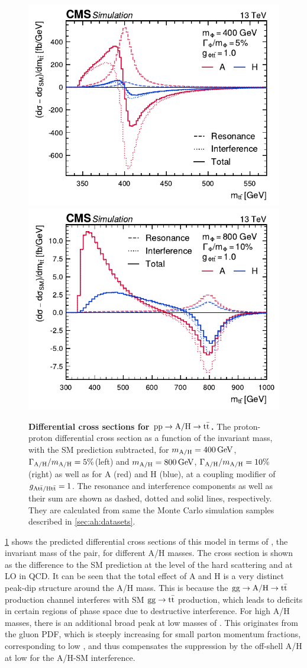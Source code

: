 \begin{figure}[ht!]
    \centering
    \includegraphics[width=0.49\linewidth]{figures/ah/ah_xs/ahspectrum_400.pdf}
    \hfill
    \includegraphics[width=0.49\linewidth]{figures/ah/ah_xs/ahspectrum_800.pdf}
    \caption{\textbf{Differential cross sections for $\mathrm{pp} \rightarrow \mathrm{A/H} \rightarrow \mathrm{t \bar{t}}$.} The proton-proton differential cross section as a function of the invariant \ttbar mass, with the SM prediction subtracted, for $m_{\mathrm{A/H}} = \SI{400}{GeV}$, $\Gamma_{\mathrm{A/H}}/m_{\mathrm{A/H}} = 5\%$(left) and $\mAH= \SI{800}{\GeV}$, $\Gamma_{\mathrm{A/H}}/m_{\mathrm{A/H}} = 10\%$ (right) as well as for A (red) and H (blue), at a coupling modifier of $g_{\mathrm{A t \bar{t} / H t \bar{t}}} = 1$. The resonance and interference components as well as their sum are shown as dashed, dotted and solid lines, respectively. They are calculated from same the Monte Carlo simulation samples described in \cref{sec:ah:datasets}.}
    \label{fig:theory:ahxs}
\end{figure}

\cref{fig:theory:ahxs} shows the predicted differential cross sections of this model in terms of \mtt, the invariant mass of the \ttbar pair, for different A/H masses. The cross section is shown as the difference to the SM prediction at the level of the hard scattering and at LO in QCD. It can be seen that the total effect of A and H is a very distinct peak-dip structure around the A/H mass. This is because the $\mathrm{gg \rightarrow A/H \rightarrow \mathrm{t \bar{t}}}$ production channel interferes with SM $\mathrm{gg \rightarrow \mathrm{t \bar{t}}}$ production, which leads to deficits in certain regions of phase space due to destructive interference. For high A/H masses, there is an additional broad peak at low masses of \mtt. This originates from the gluon PDF, which is steeply increasing for small parton momentum fractions, corresponding to low \mtt, and thus compensates the suppression by the off-shell A/H at low \mtt for the A/H-SM interference.


